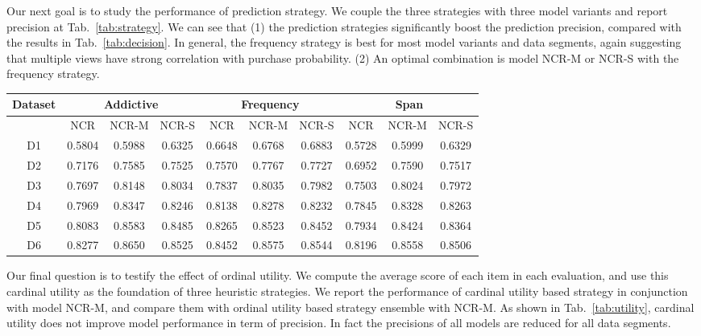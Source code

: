 \documentclass[sigconf]{acmart}
\begin{document}
Our next goal is to study the performance of prediction strategy. We couple the three strategies with three model variants and report precision at Tab.~\ref{tab:strategy}. We can see that (1) the prediction strategies significantly boost the prediction precision, compared with the results in Tab.~\ref{tab:decision}. In general, the frequency strategy is best for most model variants and data segments, again suggesting that multiple views have strong correlation with purchase probability.  (2) An optimal combination is model NCR-M or NCR-S with the frequency strategy. 


\begin{table*}[ht!]
\caption{Precision of prediction strategies on model variants }
\label{tab:strategy}
\begin{tabular}{|c|c|c|c|c|c|c|c|c|c|}
\hline
Dataset & \multicolumn{3}{|c|}{Addictive} &  \multicolumn{3}{|c|}{Frequency} & \multicolumn{3}{|c|}{Span} \\\hline
  & NCR & NCR-M & NCR-S  & NCR & NCR-M & NCR-S  & NCR & NCR-M & NCR-S \\\hline
D1 & 0.5804	& 0.5988	& 0.6325& 	0.6648& 	0.6768& 	0.6883& 	0.5728	& 0.5999	& 0.6329 \\\hline
D2& 0.7176	& 0.7585	& 0.7525	& 0.7570	& 0.7767	& 0.7727	& 0.6952	& 0.7590& 	0.7517	\\\hline
D3& 0.7697	& 0.8148	& 0.8034	& 0.7837& 	0.8035	& 0.7982	& 0.7503	& 0.8024& 	0.7972	\\\hline
D4& 0.7969& 	0.8347	& 0.8246	& 0.8138	& 0.8278	& 0.8232& 	0.7845	& 0.8328	& 0.8263\\\hline
D5& 0.8083	& 0.8583& 	0.8485& 	0.8265& 	0.8523& 	0.8452	& 0.7934 &	0.8424& 	0.8364\\\hline
D6& 0.8277	& 0.8650	& 0.8525	& 0.8452& 	0.8575& 	0.8544& 	0.8196	& 0.8558	& 0.8506	\\ \hline 
\end{tabular}
\end{table*}

Our final question is to testify the effect of ordinal utility. We compute the average score of each item in each evaluation, and use this cardinal utility as the foundation of three heuristic strategies. We report the performance of cardinal utility based strategy in conjunction with model NCR-M, and compare them with ordinal utility based strategy ensemble with NCR-M. As shown in Tab.~\ref{tab:utility}, cardinal utility does not improve model performance in term of precision. In fact the precisions of all models are reduced for all data segments. 
\end{document}
